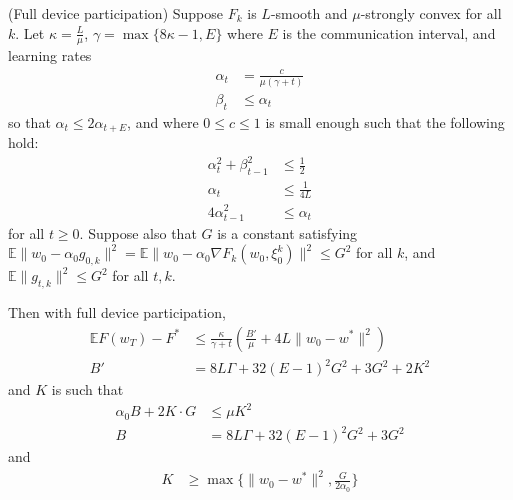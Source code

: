 \begin{theorem}
	(Full device participation) Suppose $F_{k}$ is $L$-smooth and $\mu$-strongly
	convex for all $k$. Let $\kappa=\frac{L}{\mu}$, $\gamma=\max\{8\kappa-1,E\}$
	where $E$ is the communication interval, and learning rates 
	\begin{align*}
	\alpha_{t} & =\frac{c}{\mu(\gamma+t)}\\
	\beta_{t} & \leq\alpha_{t}
	\end{align*}
	so that $\alpha_{t}\leq2\alpha_{t+E}$, and where $0\leq c\leq1$
	is small enough such that the following hold: 
	\begin{align*}
	\alpha_{t}^{2}+\beta_{t-1}^{2} & \leq\frac{1}{2}\\
	\alpha_{t} & \leq\frac{1}{4L}\\
	4\alpha_{t-1}^{2} & \leq\alpha_{t}
	\end{align*}
	for all $t\geq0$. Suppose also that $G$ is a constant satisfying
	$\mathbb{E}\|w_{0}-\alpha_{0}g_{0,k}\|^{2}=\mathbb{E}\|w_{0}-\alpha_{0}\nabla F_{k}(w_{0},\xi_{0}^{k})\|^{2}\leq G^{2}$
	for all $k$, and $\mathbb{E}\|g_{t,k}\|^{2}\leq G^{2}$ for all $t,k$. 
	
	Then with full device participation, 
	\begin{align*}
	\mathbb{E}F(w_{T})-F^{\ast} & \leq\frac{\kappa}{\gamma+t}(\frac{B'}{\mu}+4L\|w_{0}-w^{\ast}\|^{2})\\
	B' & =8L\Gamma+32(E-1)^{2}G^{2}+3G^{2}+2K^{2}
	\end{align*}
	and $K$ is such that 
	\begin{align*}
	\alpha_{0}B+2K\cdot G & \leq\mu K^{2}\\
	B & =8L\Gamma+32(E-1)^{2}G^{2}+3G^{2}
	\end{align*}
	and
	\begin{align*}
	K & \geq\max\{\|w_{0}-w^{\ast}\|^{2},\frac{G}{2\alpha_{0}}\}
	\end{align*}
\end{theorem}
